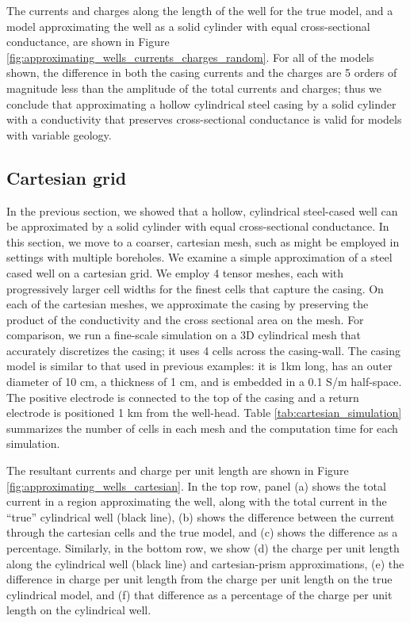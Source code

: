 \documentclass[extra,mreferee]{gji}
\begin{document}


The currents and charges along the length of the well for the true model, and a model approximating the well as a solid cylinder with equal cross-sectional conductance, are shown in Figure \ref{fig:approximating_wells_currents_charges_random}. For all of the models shown, the difference in both the casing currents and the charges are 5 orders of magnitude less than the amplitude of the total currents and charges; thus we conclude that approximating a hollow cylindrical steel casing by a solid cylinder with a conductivity that preserves cross-sectional conductance is valid for models with variable geology.





\subsection{Cartesian grid}
In the previous section, we showed that a hollow, cylindrical steel-cased well can be approximated by a solid cylinder with equal cross-sectional conductance. In this section, we move to a coarser, cartesian mesh, such as might be employed in settings with multiple boreholes. We examine a simple approximation of a steel cased well on a cartesian grid. We employ 4 tensor meshes, each with progressively larger cell widths for the finest cells that capture the casing. On each of the cartesian meshes, we approximate the casing by preserving the product of the conductivity and the cross sectional area on the mesh. For comparison, we run a fine-scale simulation on a 3D cylindrical mesh that accurately discretizes the casing; it uses 4 cells across the casing-wall. The casing model is similar to that used in previous examples: it is 1km long, has an outer diameter of 10 cm, a thickness of 1 cm, and is embedded in a 0.1 S/m half-space. The positive electrode is connected to the top of the casing and a return electrode is positioned 1 km from the well-head. Table \ref{tab:cartesian_simulation} summarizes the number of cells in each mesh and the computation time for each simulation.




The resultant currents and charge per unit length are shown in Figure \ref{fig:approximating_wells_cartesian}. In the top row, panel (a) shows the total current in a region approximating the well, along with the total current in the ``true'' cylindrical well (black line), (b) shows the difference between the current through the cartesian cells and the true model, and (c) shows the difference as a percentage. Similarly, in the bottom row, we show (d) the charge per unit length along the cylindrical well (black line) and cartesian-prism approximations, (e) the difference in charge per unit length from the charge per unit length on the true cylindrical model, and (f) that difference as a percentage of the charge per unit length on the cylindrical well.
\end{document}
